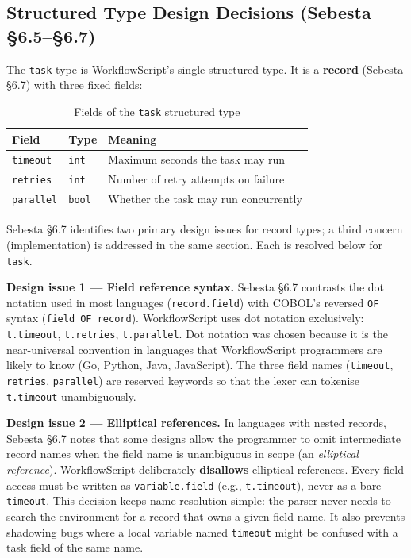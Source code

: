 \documentclass[10pt,a4paper]{article}
\begin{document}
\subsection{Structured Type Design Decisions (Sebesta \S6.5--\S6.7)}

The \texttt{task} type is WorkflowScript's single structured type. It is a \textbf{record}
(Sebesta \S6.7) with three fixed fields:

\begin{table}[h!]
\centering
\begin{tabular}{@{}lll@{}}
\toprule
\textbf{Field} & \textbf{Type} & \textbf{Meaning} \\
\midrule
\texttt{timeout}  & \texttt{int}  & Maximum seconds the task may run \\
\texttt{retries}  & \texttt{int}  & Number of retry attempts on failure \\
\texttt{parallel} & \texttt{bool} & Whether the task may run concurrently \\
\bottomrule
\end{tabular}
\caption{Fields of the \texttt{task} structured type}
\end{table}

Sebesta \S6.7 identifies two primary design issues for record types; a third concern
(implementation) is addressed in the same section. Each is resolved below for \texttt{task}.

\textbf{Design issue 1 --- Field reference syntax.}
Sebesta \S6.7 contrasts the dot notation used in most languages (\texttt{record.field}) with
COBOL's reversed \texttt{OF} syntax (\texttt{field OF record}). WorkflowScript uses dot
notation exclusively: \texttt{t.timeout}, \texttt{t.retries}, \texttt{t.parallel}. Dot
notation was chosen because it is the near-universal convention in languages that
WorkflowScript programmers are likely to know (Go, Python, Java, JavaScript). The three field
names (\texttt{timeout}, \texttt{retries}, \texttt{parallel}) are reserved keywords so that
the lexer can tokenise \texttt{t.timeout} unambiguously.

\textbf{Design issue 2 --- Elliptical references.}
In languages with nested records, Sebesta \S6.7 notes that some designs allow the programmer
to omit intermediate record names when the field name is unambiguous in scope (an
\textit{elliptical reference}). WorkflowScript deliberately \textbf{disallows} elliptical
references. Every field access must be written as \texttt{variable.field}
(e.g., \texttt{t.timeout}), never as a bare \texttt{timeout}. This decision keeps name
resolution simple: the parser never needs to search the environment for a record that owns a
given field name. It also prevents shadowing bugs where a local variable named \texttt{timeout}
might be confused with a task field of the same name.
\end{document}

